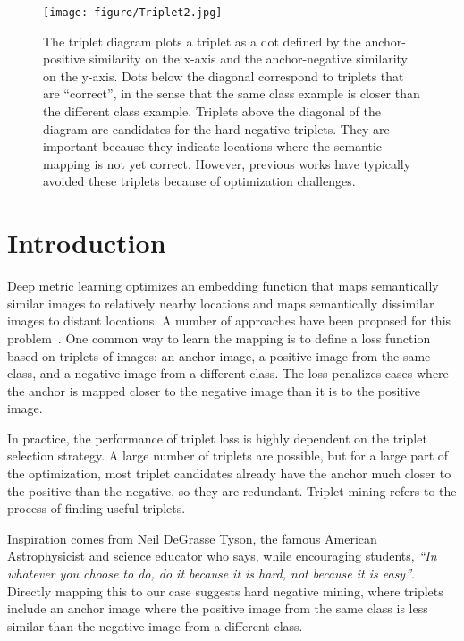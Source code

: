 \documentclass[runningheads]{llncs}
\begin{document}
\begin{figure}[t]
\begin{center}
  \texttt{[image: figure/Triplet2.jpg]}
  \caption{The triplet diagram plots a triplet as a dot defined by the anchor-positive similarity  on the x-axis and the anchor-negative similarity  on the y-axis. Dots below the diagonal correspond to triplets that are ``correct'', in the sense that the same class example is closer than the different class example.  Triplets above the diagonal of the diagram are candidates for the hard negative triplets.  They are important because they indicate locations where the semantic mapping is not yet correct.  However, previous works have typically avoided these triplets because of optimization challenges.}
  \label{fig:scatter}
\end{center}
\end{figure}

\section{Introduction}
Deep metric learning optimizes an embedding function that maps semantically similar images to relatively nearby locations and maps semantically dissimilar images to distant locations. A number of approaches have been proposed for this problem~\cite{HTL,ABE,Proxy,facenet,Npairs,SOP,DREML}. One common way to learn the mapping is to define a loss function based on triplets of images: an anchor image, a positive image from the same class, and a negative image from a different class. The loss penalizes cases where the anchor is mapped closer to the negative image than it is to the positive image. 

In practice, the performance of triplet loss is highly dependent on the triplet selection strategy.  A large number of triplets are possible, but for a large part of the optimization, most triplet candidates already have the anchor much closer to the positive than the negative, so they are redundant. Triplet mining refers to the process of finding useful triplets.  

Inspiration comes from Neil DeGrasse Tyson, the famous American Astrophysicist and science educator who says, while encouraging students, {\it ``In whatever you choose to do, do it because it is hard, not because it is easy''}.  Directly mapping this to our case suggests hard negative mining, where triplets include an anchor image where the positive image from the same class is less similar than the negative image from a different class.
\end{document}
